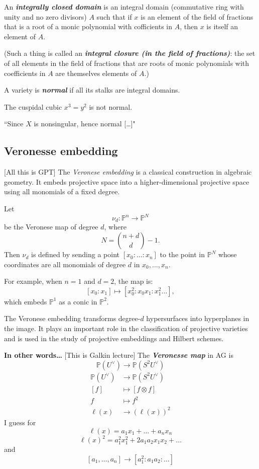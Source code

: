 An \textit{\textbf{integrally closed domain}} is an integral domain (commutative ring with unity and no zero divisors) \(A\) such that if \(x\) is an element of the field of fractions that is a root of a monic polynomial with cofficients in \(A\), then \(x\) is itself an element of \(A\).

(Such a thing is called an \textit{\textbf{integral closure (in the field of fractions)}}: the set of all elements in the field of fractions that are roots of monic polynomials with coefficients in \(A\) are themselves elements of \(A\).)

A variety is \textit{\textbf{normal}} if all its stalks are integral domains.

The cuspidal cubic \(x^3=y^2\) is not normal.

``Since \(X\) is nonsingular, hence normal […]"




\subsection{Veronesse embedding}
[All this is GPT] The \emph{Veronese embedding} is a classical construction in algebraic geometry. It embeds projective space into a higher-dimensional projective space using all monomials of a fixed degree.

Let
\[
\nu_d : \mathbb{P}^n \to \mathbb{P}^N
\]
be the Veronese map of degree \( d \), where
\[
N = \binom{n + d}{d} - 1.
\]
Then \( \nu_d \) is defined by sending a point \( [x_0 : \dots : x_n] \) to the point in \( \mathbb{P}^N \) whose coordinates are all monomials of degree \( d \) in \( x_0, \dots, x_n \).

For example, when \( n = 1 \) and \( d = 2 \), the map is:
\[
[x_0 : x_1] \mapsto [x_0^2 : x_0x_1 : x_1^2\ldots],
\]
which embeds \( \mathbb{P}^1 \) as a conic in \( \mathbb{P}^2 \).

The Veronese embedding transforms degree-\( d \) hypersurfaces into hyperplanes in the image. It plays an important role in the classification of projective varieties and is used in the study of projective embeddings and Hilbert schemes.

\textbf{In other words…} [This is Galkin lecture] The \textit{\textbf{Veronesse map}} in AG is 
\[\mathbb{P}(U^\vee) \to \mathbb{P}(S^2 U^\vee)\]
\begin{align*}
	\mathbb{P}(U^\vee ) &\longrightarrow \mathbb{P}(S^2U^\vee) \\
	[f] &\longmapsto [f \otimes f]\\
	f & \longmapsto f^2\\
	\ell(x) & \longrightarrow (\ell(x))^2
\end{align*}
I guess for
\[\ell(x)=a_1x_1+\ldots+a_nx_n\]
\[\ell(x)^2=a_1^2x_1^2+2a_1a_2x_1x_2+\ldots\]
and
\[[a_1,\ldots,a_n]\to [a_1^2:a_1a_2:\ldots]\]

